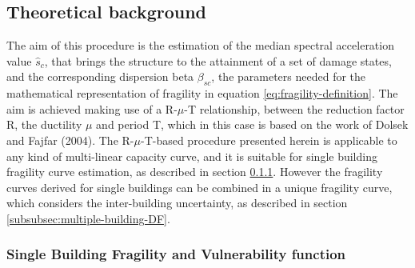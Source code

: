 \subsection{Theoretical background}
The aim of this procedure is the estimation of the median spectral acceleration value $\hat{s}_c$, that brings the structure to the attainment of a set of damage states, and the corresponding dispersion beta $\beta_{sc}$, the parameters needed for the mathematical representation of fragility in equation \ref{eq:fragility-definition}. The aim is achieved making use of a R-$\mu$-T relationship, between the reduction factor R, the ductility $\mu$ and period T, which in this case is based on the work of Dolsek and Fajfar (2004).
The R-$\mu$-T-based procedure presented herein is applicable to any kind of multi-linear capacity curve, and it is suitable for single building fragility curve estimation, as described in section \ref{subsubsec:single-building-DF}. However the fragility curves derived for single buildings can be combined in a unique fragility curve, which considers the inter-building uncertainty, as described in section \ref{subsubsec:multiple-building-DF}.

\subsubsection{Single Building Fragility and Vulnerability function}
\label{subsubsec:single-building-DF}

